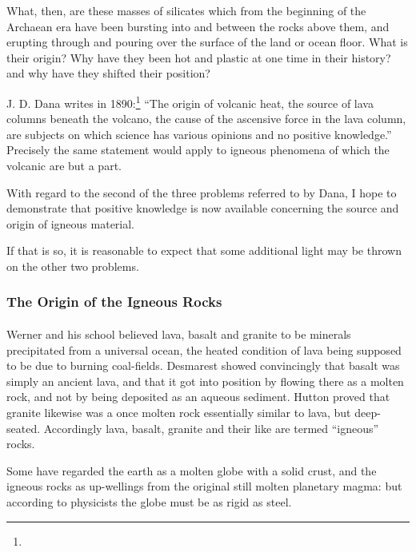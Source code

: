 \documentclass[a4paper, 12pt, oneside]{article}
\begin{document}
What, then, are these masses of silicates which from the beginning of the Archaean era have been bursting into and between the rocks above them, and erupting through and pouring over the surface of the land or ocean floor. What is their origin? Why have they been hot and plastic at one time in their history? and why have they shifted their position?

J. D. Dana writes in 1890:\footnote{} ``The origin of volcanic heat, the source of lava columns beneath the volcano, the cause of the ascensive force in the lava column, are subjects on which science has various opinions and no positive knowledge.'' Precisely the same statement would apply to igneous phenomena of which the volcanic are but a part.

With regard to the second of the three problems referred to by Dana, I hope to demonstrate that positive knowledge is now available concerning the source and origin of igneous material.

If that is so, it is reasonable to expect that some additional light may be thrown on the other two problems.

\subsubsection{The Origin of the Igneous Rocks}
\paragraph{}
Werner and his school believed lava, basalt and granite to be minerals precipitated from a universal ocean, the heated condition of lava being supposed to be due to burning coal-fields. Desmarest showed convincingly that basalt was simply an ancient lava, and that it got into position by flowing there as a molten rock, and not by being deposited as an aqueous sediment. Hutton proved that granite likewise was a once molten rock essentially similar to lava, but deep-seated. Accordingly lava, basalt, granite and their like are termed ``igneous'' rocks.

Some have regarded the earth as a molten globe with a solid crust, and the igneous rocks as up-wellings from the original still molten planetary magma: but according to physicists the globe must be as rigid as steel.
\end{document}
